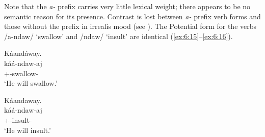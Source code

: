 \begin{table}\caption{Minimal pairs showing presence of historical /a-/ prefix}\label{tab:42}
\end{table}

\largerpage
Note that the \textit{a-} prefix carries very little lexical weight; there appears to be no semantic reason for its presence. Contrast is lost between \textit{a-} prefix verb forms and those without the prefix in irrealis mood (see ). The Potential form for the verbs /a-ndaw/ ‘swallow’ and /ndaw/ ‘insult’ are identical (\ref{ex:6:15}--\ref{ex:6:16}). 

\ea \label{ex:6:15}
Káandáway.\\
\gll  káá-ndaw-aj\\
      {\twoS}+{\POT}-swallow{}-{\CL}\\
\glt  ‘He will swallow.’    
\z

\ea \label{ex:6:16}
Káandaway.\\
\gll  káá-ndaw-aj\\
      {\twoS}+{\POT}-insult{}-{\CL}\\
\glt  ‘He will insult.’
\z

